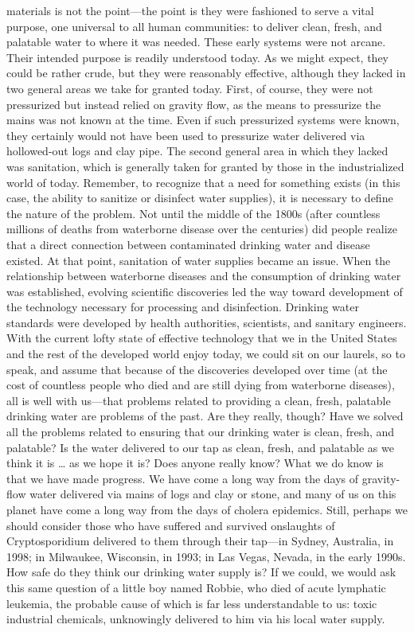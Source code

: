 \documentclass{article}
\begin{document}
materials is not the point---the point is they were fashioned to serve a
vital purpose, one universal to all human communities: to deliver clean,
fresh, and palatable water to where it was needed. These early systems
were not arcane. Their intended purpose is readily understood today. As
we might expect, they could be rather crude, but they were reasonably
effective, although they lacked in two general areas we take for granted
today. First, of course, they were not pressurized but instead relied on
gravity flow, as the means to pressurize the mains was not known at the
time. Even if such pressurized systems were known, they certainly would
not have been used to pressurize water delivered via hollowed-out logs
and clay pipe. The second general area in which they lacked was
sanitation, which is generally taken for granted by those in the
industrialized world of today. Remember, to recognize that a need for
something exists (in this case, the ability to sanitize or disinfect
water supplies), it is necessary to define the nature of the problem.
Not until the middle of the 1800s (after countless millions of deaths
from waterborne disease over the centuries) did people realize that a
direct connection between contaminated drinking water and disease
existed. At that point, sanitation of water supplies became an issue.
When the relationship between waterborne diseases and the consumption of
drinking water was established, evolving scientific discoveries led the
way toward development of the technology necessary for processing and
disinfection. Drinking water standards were developed by health
authorities, scientists, and sanitary engineers. With the current lofty
state of effective technology that we in the United States and the rest
of the developed world enjoy today, we could sit on our laurels, so to
speak, and assume that because of the discoveries developed over time
(at the cost of countless people who died and are still dying from
waterborne diseases), all is well with us---that problems related to
providing a clean, fresh, palatable drinking water are problems of the
past. Are they really, though? Have we solved all the problems related
to ensuring that our drinking water is clean, fresh, and palatable? Is
the water delivered to our tap as clean, fresh, and palatable as we
think it is \ldots{} as we hope it is? Does anyone really know? What we
do know is that we have made progress. We have come a long way from the
days of gravity-flow water delivered via mains of logs and clay or
stone, and many of us on this planet have come a long way from the days
of cholera epidemics. Still, perhaps we should consider those who have
suffered and survived onslaughts of Cryptosporidium delivered to them
through their tap---in Sydney, Australia, in 1998; in Milwaukee,
Wisconsin, in 1993; in Las Vegas, Nevada, in the early 1990s. How safe
do they think our drinking water supply is? If we could, we would ask
this same question of a little boy named Robbie, who died of acute
lymphatic leukemia, the probable cause of which is far less
understandable to us: toxic industrial chemicals, unknowingly delivered
to him via his local water supply.
\end{document}
